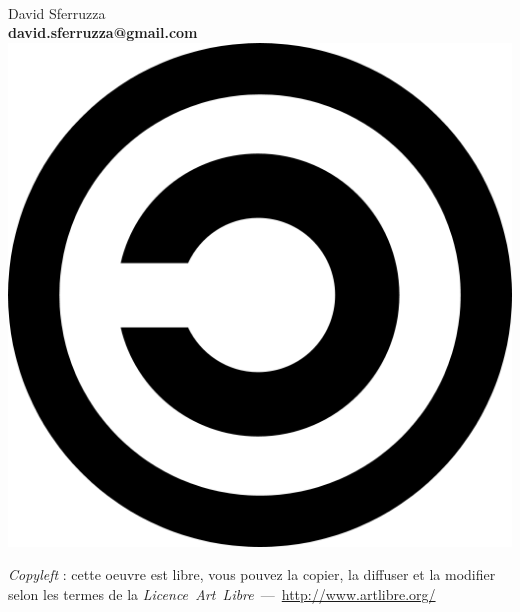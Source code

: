 \begin{titlepage}
~\vfill
\begin{center}
\begin{minipage}[c]{10cm}
\begin{center}
	\textbf{\titre}
	\linebreak
	\linebreak
	David Sferruzza\\
	\textbf{david.sferruzza@gmail.com}
	\linebreak
	\linebreak
	\linebreak
	\linebreak
	\includegraphics[scale=.05]{images/copyleft.png} 
	\end{center}
	\textit{Copyleft} : cette oeuvre est libre, vous pouvez la copier,
	la diffuser et la modifier selon les termes de la
	\textit{Licence~Art~Libre}~---~\url{http://www.artlibre.org/}
\end{minipage}
\end{center}
\vfill
\end{titlepage}
